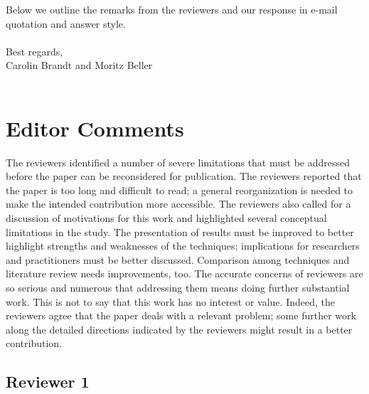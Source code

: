 \documentclass[10pt,a4wide]{article}
\renewenvironment{leftbar}{%
	\vspace{0.1cm}
	\def\FrameCommand{\vrule width 0.4pt \hspace{15pt}}%
	\MakeFramed {\advance\hsize-\width \FrameRestore}}%
{\endMakeFramed\vspace{0.1cm}}
\begin{document}
\noindent
Below we outline the remarks from the reviewers and our response in e-mail quotation and 
answer style.
\\
\\
Best regards,
\\
Carolin Brandt and Moritz Beller
\\\\
\noindent


\begin{leftbar}

\end{leftbar}


\section*{Editor Comments}

\begin{leftbar}
The reviewers identified a number of severe limitations that must be addressed before the paper can be reconsidered for publication. The reviewers reported that the paper is too long and difficult to read; a general reorganization is needed to make the intended contribution more accessible. The reviewers also called for a discussion of motivations for this work and highlighted several conceptual limitations in the study. The presentation of results must be improved to better highlight strengths and weaknesses of the techniques; implications for researchers and practitioners must be better discussed. Comparison among techniques and literature review needs improvements, too. The accurate concerns of reviewers are so serious and numerous that addressing them means doing further substantial work. This is not to say that this work has no interest or value. Indeed, the reviewers agree that the paper deals with a relevant problem; some further work along the detailed directions indicated by the reviewers might result in a better contribution.
\end{leftbar}

\subsection*{Reviewer 1}


\end{document}
